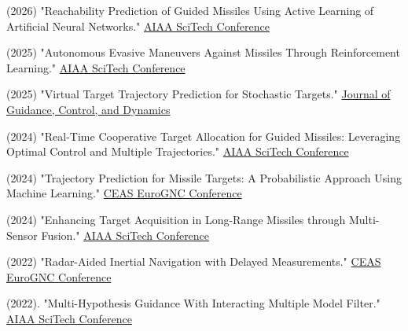 \documentclass[11pt,a4paper]{article}
\begin{document}
\begin{enumerate}[label=\textbf{[\arabic*]}, leftmargin=0.8cm, itemsep=3pt]

    \item (2026) "Reachability Prediction of Guided Missiles Using Active Learning of Artificial Neural Networks." \href{https://arc.aiaa.org/doi/abs/10.2514/6.2026-2166}{AIAA SciTech Conference}
    
    \item (2025) "Autonomous Evasive Maneuvers Against Missiles Through Reinforcement Learning." \href{https://www.researchgate.net/publication/387995943_Autonomous_Evasive_Maneuvers_against_Missiles_through_Reinforcement_Learning}{AIAA SciTech Conference}

    \item (2025) "Virtual Target Trajectory Prediction for Stochastic Targets." \href{https://arxiv.org/pdf/2504.01851}{Journal of Guidance, Control, and Dynamics}
    
    \item (2024) "Real-Time Cooperative Target Allocation for Guided Missiles: Leveraging Optimal Control and Multiple Trajectories." \href{https://arc.aiaa.org/doi/10.2514/6.2025-1907}{AIAA SciTech Conference}

    \item (2024) "Trajectory Prediction for Missile Targets: A Probabilistic Approach Using Machine Learning." \href{https://www.researchgate.net/publication/381520100_Trajectory_Prediction_for_Missile_Targets_A_Probabilistic_Approach_Using_Machine_Learning}{CEAS EuroGNC Conference}
    
    
    \item (2024) "Enhancing Target Acquisition in Long-Range Missiles through Multi-Sensor Fusion." \href{https://www.researchgate.net/publication/377395801_Enhancing_Target_Acquisition_in_Long-Range_Missiles_through_Multi-Sensor_Fusion}{AIAA SciTech Conference}
    
    \item (2022) "Radar-Aided Inertial Navigation with Delayed Measurements." \href{https://www.researchgate.net/publication/360484762_Radar-Aided_Inertial_Navigation_with_Delayed_Measurements}{CEAS EuroGNC Conference}
    
    \item (2022). "Multi-Hypothesis Guidance With Interacting Multiple Model Filter." \href{https://www.researchgate.net/publication/357595202_Multi-Hypothesis_Guidance_With_Interacting_Multiple_Model_Filter}{AIAA SciTech Conference}
\end{enumerate}
\end{document}
